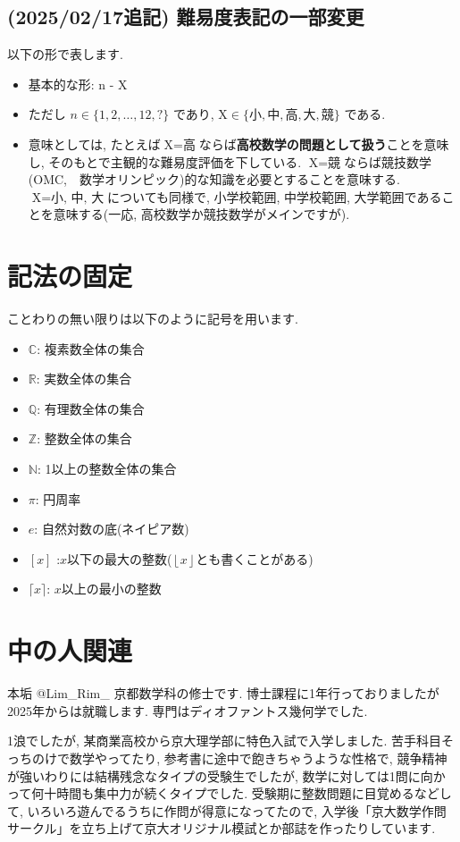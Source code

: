 \documentclass[twocolumn]{jsarticle}
\begin{document}
\subsection{(2025/02/17追記) 難易度表記の一部変更}
以下の形で表します. 
\begin{itemize}
\item 基本的な形: \hosi n - X
\item ただし $n\in \{ 1,2,\dots, 12, ?\}$ であり, $\text{X} \in \{ 小, 中, 高, 大, 競\}$ である. 
\item 意味としては, たとえば$\text{X} = \text{高}$ならば\textbf{高校数学の問題として扱う}ことを意味し, そのもとで主観的な難易度評価を下している. $\text{X} = \text{競}$ならば競技数学(OMC,　数学オリンピック)的な知識を必要とすることを意味する. $\text{X} = \text{小, 中, 大}$についても同様で, 小学校範囲, 中学校範囲, 大学範囲であることを意味する(一応, 高校数学か競技数学がメインですが). 
\end{itemize}

\section{記法の固定}
ことわりの無い限りは以下のように記号を用います. 
\begin{itemize}
\item $\mathbb{C}$: 複素数全体の集合
\item $\mathbb{R}$: 実数全体の集合
\item $\mathbb{Q}$: 有理数全体の集合
\item $\mathbb{Z}$: 整数全体の集合
\item $\mathbb{N}$: 1以上の整数全体の集合
\item $\pi$: 円周率
\item $e$: 自然対数の底(ネイピア数)
\item $[x]$ :$x$以下の最大の整数($\left\lfloor x \right\rfloor$とも書くことがある)
\item $\lceil x \rceil$: $x$以上の最小の整数
\end{itemize}

\section{中の人関連}
本垢 @Lim\_Rim\_  京都数学科の修士です. 博士課程に1年行っておりましたが2025年からは就職します. 専門はディオファントス幾何学でした. \par 
1浪でしたが, 某商業高校から京大理学部に特色入試で入学しました. 苦手科目そっちのけで数学やってたり, 参考書に途中で飽きちゃうような性格で, 競争精神が強いわりには結構残念なタイプの受験生でしたが, 数学に対しては1問に向かって何十時間も集中力が続くタイプでした. 受験期に整数問題に目覚めるなどして, いろいろ遊んでるうちに作問が得意になってたので, 入学後「京大数学作問サークル」を立ち上げて京大オリジナル模試とか部誌を作ったりしています. 
\end{document}
